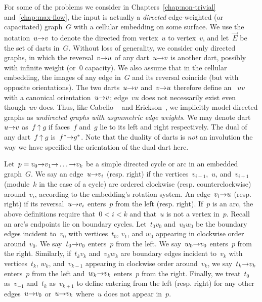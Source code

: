 For some of the problems we consider in Chapters~\ref{chap:non-trivial} and~\ref{chap:max-flow}, the input is actually a \emph{directed} edge-weighted (or capacitated)
graph~$G$ with a cellular embedding on some surface.
We use the
notation~$u \mathord{\rightarrow} v$ to denote the directed  from vertex~$u$ to vertex~$v$, and let~$\vec{E}$ be the set of darts in~$G$.
Without loss of generality, we consider only  directed graphs,
in which the reversal~$v \mathord{\rightarrow} u$ of any dart~$u \mathord{\rightarrow} v$ is another dart,
possibly with infinite weight (or~$0$ capacity).
We also assume that in the cellular embedding,
the images of any edge in~$G$ and its reversal coincide (but with opposite
orientations).
The two darts~$u \mathord{\rightarrow} v$ and~$v \mathord{\rightarrow} u$ therefore define an ~$uv$
with a canonical orientation~$u \mathord{\rightarrow} v$; edge~$vu$ does not necessarily exist even though~$uv$ does.
Thus, like Cabello \etal~\cite{ccl-fsncd-10} and Erickson~\cite{e-sncds-11},
we implicitly model directed graphs as \emph{undirected graphs with asymmetric
edge weights}.
We may denote dart~$u \mathord{\rightarrow} v$ as~$f \uparrow g$ if faces~$f$ and~$g$ lie to its left and right respectively.
The dual of any dart~$f \uparrow g$ is~$f^* \mathord{\rightarrow} g^*$.
Note that the duality of darts is \emph{not} an involution the way we have specified the orientation of the dual dart here.

Let~$p = v_0 \mathord{\rightarrow} v_1 \mathord{\rightarrow} \dots \mathord{\rightarrow} v_k$ be a simple directed cycle
or arc in an
embedded graph~$G$. We say an edge~$u \mathord{\rightarrow} v_i$ 
(resp. right) if the vertices~$v_{i-1}$,~$u$, and~$v_{i+1}$ (module~$k$
in the case of a cycle) are ordered
clockwise (resp. counterclockwise) around~$v_i$, according to the
embedding's rotation system. An edge~$v_i \mathord{\rightarrow} u$  (resp. right) if its reversal~$u \mathord{\rightarrow} v_i$ enters~$p$ from the
left (resp. right).
If~$p$ is an arc,
the above definitions require that~$0 < i < k$ and that~$u$
is not a vertex in~$p$. Recall an arc's endpoints lie on boundary cycles.
Let~$t_0 v_0$ and~$v_0 w_0$ be the boundary edges
incident to~$v_0$ with vertices~$t_0$, $v_1$, and $w_0$ appearing in clockwise
order around~$v_0$. We say~$t_0 \mathord{\rightarrow} v_0$ enters~$p$ from the left.
We say~$w_0 \mathord{\rightarrow} v_0$ enters~$p$
from the right. Similarly,
if~$t_k v_k$ and~$v_k w_k$ are boundary edges incident to~$v_k$ with
vertices~$t_k$, $w_k$, and~$v_{k-1}$ appearing in clockwise order around~$v_k$,
we say~$t_k \mathord{\rightarrow} v_k$ enters~$p$ from the left and~$w_k \mathord{\rightarrow} v_k$
enters~$p$ from the right. Finally, we treat~$t_0$ as~$v_{-1}$ and~$t_k$
as~$v_{k+1}$ to define entering from the left (resp. right) for any
other edges~$u \mathord{\rightarrow} v_0$ or~$u \mathord{\rightarrow} v_k$ where~$u$ does not appear in~$p$.

